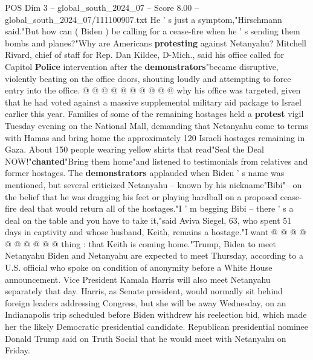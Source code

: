 \begin{textsample}{POS Dim 3 – global\_south\_2024\_07 – Score 8.00 – global\_south\_2024\_07/111100907.txt}
He ' s just a symptom,"Hirschmann said."But how can ( Biden ) be calling for a cease-fire when he ' s sending them bombs and planes?"Why are Americans \textbf{protesting} against Netanyahu?
Mitchell Rivard, chief of staff for Rep.
Dan Kildee, D-Mich., said his office called for Capitol \textbf{Police} intervention after the \textbf{demonstrators}"became disruptive, violently beating on the office doors, shouting loudly and attempting to force entry into the office. @ @ @ @ @ @ @ @ @ @ why his office was targeted, given that he had voted against a massive supplemental military aid package to Israel earlier this year.
Families of some of the remaining hostages held a \textbf{protest} vigil Tuesday evening on the National Mall, demanding that Netanyahu come to terms with Hamas and bring home the approximately 120 Israeli hostages remaining in Gaza.
About 150 people wearing yellow shirts that read"Seal the Deal NOW!"\textbf{chanted}"Bring them home"and listened to testimonials from relatives and former hostages.
The \textbf{demonstrators} applauded when Biden ' s name was mentioned, but several criticized Netanyahu -- known by his nickname"Bibi"-- on the belief that he was dragging his feet or playing hardball on a proposed cease-fire deal that would return all of the hostages."I ' m begging Bibi -- there ' s a deal on the table and you have to take it,"said Aviva Siegel, 63, who spent 51 days in captivity and whose husband, Keith, remains a hostage."I want @ @ @ @ @ @ @ @ @ @ thing : that Keith is coming home."Trump, Biden to meet Netanyahu Biden and Netanyahu are expected to meet Thursday, according to a U.S. official who spoke on condition of anonymity before a White House announcement.
Vice President Kamala Harris will also meet Netanyahu separately that day.
Harris, as Senate president, would normally sit behind foreign leaders addressing Congress, but she will be away Wednesday, on an Indianapolis trip scheduled before Biden withdrew his reelection bid, which made her the likely Democratic presidential candidate.
Republican presidential nominee Donald Trump said on Truth Social that he would meet with Netanyahu on Friday.

\end{textsample}
